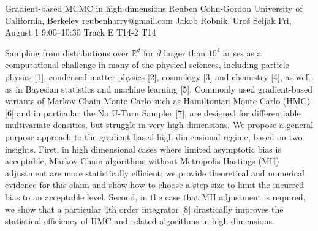 \begin{talk}
  {Gradient-based MCMC in high dimensions}%
  {Reuben Cohn-Gordon}%
  {University of California, Berkeley}%
  {reubenharry@gmail.com}%
  {Jakob Robnik, Uroš Seljak}%
  {}%
  {Fri, August 1 9:00–10:30 Track E}%
  {T14-2}%
  {T14}%
  
				
			
Sampling from distributions over $\mathbb{R}^d$ for $d$ larger than $10^4$ arises as a computational challenge in many of the physical sciences, including particle physics [1], condensed matter physics [2], cosmology [3] and chemistry [4], as well as in Bayesian statistics and machine learning [5]. Commonly used gradient-based variants of Markov Chain Monte Carlo such as Hamiltonian Monte Carlo (HMC) [6] and in particular the No U-Turn Sampler [7], are designed for differentiable multivariate densities, but struggle in very high dimensions. 
We propose a general purpose approach to the gradient-based high dimensional regime, based on two insights. First, in high dimensional cases where limited asymptotic bias is acceptable, Markov Chain algorithms without Metropolis-Hastings (MH) adjustment are more statistically efficient; we provide theoretical and numerical evidence for this claim and show how to choose a step size to limit the incurred bias to an acceptable level. Second, in the case that MH adjustment is required, we show that a particular 4th order integrator [8] drastically improves the statistical efficiency of HMC and related algorithms in high dimensions.


\medskip


\end{talk}
